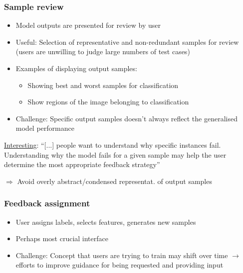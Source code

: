 \documentclass[12pt,a4paper]{article}
\begin{document}
\subsubsection{Sample review}
\begin{itemize}
\item Model outputs are presented for review by user
\item Useful: Selection of representative and non-redundant samples for review (users are unwilling to judge large numbers of test cases)
\item Examples of displaying output samples:
\begin{itemize}
\item Showing best and worst samples for classification
\item Show regions of the image belonging to classification
\end{itemize}
\item Challenge: Specific output samples doesn't always reflect the generalised model performance
\end{itemize}
\begin{description}
\item \underline{Interesting}: ``[...]  people want to understand why specific instances fail. Understanding why the model fails for a given sample may help the user determine the most appropriate feedback strategy''
\item $\Rightarrow$ Avoid overly abstract/condensed representat. of output samples
\end{description}
\subsubsection{Feedback assignment}
\begin{itemize}
\item User assigns labels, selects features, generates new samples
\item Perhaps most crucial interface
\item Challenge: Concept that users are trying to train may shift over time $\rightarrow$ efforts to improve guidance for being requested and providing input
\end{itemize}
\end{document}
